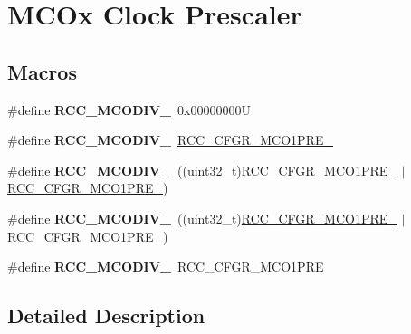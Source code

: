 \hypertarget{group___r_c_c___m_c_ox___clock___prescaler}{}\section{M\+C\+Ox Clock Prescaler}
\label{group___r_c_c___m_c_ox___clock___prescaler}
\subsection*{Macros}
\begin{DoxyCompactItemize}
\item 
\mbox{\label{group___r_c_c___m_c_ox___clock___prescaler_ga438d8c3bead4e1ec5dd5757cb0313d53}} 
\#define {\bfseries R\+C\+C\+\_\+\+M\+C\+O\+D\+I\+V\+\_}~0x00000000U
\item 
\mbox{\label{group___r_c_c___m_c_ox___clock___prescaler_ga6198330847077f4da351915518140bfc}} 
\#define {\bfseries R\+C\+C\+\_\+\+M\+C\+O\+D\+I\+V\+\_}~\mbox{\hyperlink{group___peripheral___registers___bits___definition_ga11e1d10d1b55e0d88d24212ea2c8ba6e}{R\+C\+C\+\_\+\+C\+F\+G\+R\+\_\+\+M\+C\+O1\+P\+R\+E\+\_}}
\item 
\mbox{\label{group___r_c_c___m_c_ox___clock___prescaler_gab9dac03733c3c5bd8877ef43bff3d5f4}} 
\#define {\bfseries R\+C\+C\+\_\+\+M\+C\+O\+D\+I\+V\+\_}~((uint32\+\_\+t)\mbox{\hyperlink{group___peripheral___registers___bits___definition_gac8007a9d6ee3fd88912aaf290746ae0e}{R\+C\+C\+\_\+\+C\+F\+G\+R\+\_\+\+M\+C\+O1\+P\+R\+E\+\_}} $\vert$ \mbox{\hyperlink{group___peripheral___registers___bits___definition_ga11e1d10d1b55e0d88d24212ea2c8ba6e}{R\+C\+C\+\_\+\+C\+F\+G\+R\+\_\+\+M\+C\+O1\+P\+R\+E\+\_}})
\item 
\mbox{\label{group___r_c_c___m_c_ox___clock___prescaler_ga1bdc2eb56aaeb53dc3ca5cd72f22d4c8}} 
\#define {\bfseries R\+C\+C\+\_\+\+M\+C\+O\+D\+I\+V\+\_}~((uint32\+\_\+t)\mbox{\hyperlink{group___peripheral___registers___bits___definition_gaaf7c1280f61d56b4897f9c876987e092}{R\+C\+C\+\_\+\+C\+F\+G\+R\+\_\+\+M\+C\+O1\+P\+R\+E\+\_}} $\vert$ \mbox{\hyperlink{group___peripheral___registers___bits___definition_ga11e1d10d1b55e0d88d24212ea2c8ba6e}{R\+C\+C\+\_\+\+C\+F\+G\+R\+\_\+\+M\+C\+O1\+P\+R\+E\+\_}})
\item 
\mbox{\label{group___r_c_c___m_c_ox___clock___prescaler_ga67292dd05ceb8189ec439d4ac4d58b88}} 
\#define {\bfseries R\+C\+C\+\_\+\+M\+C\+O\+D\+I\+V\+\_}~R\+C\+C\+\_\+\+C\+F\+G\+R\+\_\+\+M\+C\+O1\+P\+RE
\end{DoxyCompactItemize}


\subsection{Detailed Description}
